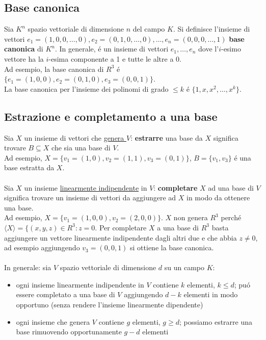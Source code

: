 \documentclass{article}
\begin{document}
\subsection{Base canonica}
Sia $K^n$ spazio vettoriale di dimensione $n$ del campo $K$. Si definisce l'insieme di vettori $e_1 = (1,0,0, \dots, 0), e_2 = (0,1,0, \dots, 0), \dots, e_n = (0,0,0,\dots,1)$ \textbf{base canonica} di $K^n$.
In generale, é un insieme di vettori $e_1, \dots, e_n$ dove l'$i$-esimo vettore ha la $i$-esima componente a 1 e tutte le altre a 0.\\
Ad esempio, la base canonica di $R^3$ é $\{e_1 = (1,0,0), e_2 = (0,1,0), e_3 = (0,0,1)\}$.\\
La base canonica per l'insieme dei polinomi di grado $\le k$ é $\{1, x, x^2, \dots, x^k\}$.

\subsection{Estrazione e completamento a una base}
Sia $X$ un insieme di vettori che \underline{genera $V$}: \textbf{estrarre} una base da $X$ significa trovare $B \subseteq X$ che sia una base di $V$.\\
Ad esempio, $X = \{v_1 = (1,0), v_2 = (1,1), v_3 = (0,1)\}$, $B = \{v_1, v_3\}$ é una base estratta da $X$.\\\\
Sia $X$ un insieme \underline{linearmente indipendente} in $V$: \textbf{completare} $X$ ad una base di $V$ significa trovare un insieme di vettori da aggiungere ad $X$ in modo da ottenere una base.\\
Ad esempio, $X = \{v_1 = (1,0,0), v_2 = (2,0,0)\}$. $X$ non genera $R^3$ perché $\langle X \rangle = \{(x,y,z) \in R^3 : z = 0$. Per completare $X$ a una base di $R^3$ basta aggiungere un vettore linearmente indipendente dagli altri due e che abbia $z \ne 0$, ad esempio aggiungendo $v_3 = (0,0,1)$ si ottiene la base canonica.\\\\
In generale: sia $V$ spazio vettoriale di dimensione $d$ su un campo $K$:
\begin{itemize}
	\item ogni insieme linearmente indipendente in $V$ contiene $k$ elementi, $k \le d$; puó essere completato a una base di $V$ aggiungendo $d-k$ elementi in modo opportuno (senza rendere l'insieme linearmente dipendente)
	\item ogni insieme che genera $V$ contiene $g$ elementi, $g \ge d$; possiamo estrarre una base rimuovendo opportunamente $g - d$ elementi
\end{itemize}
\end{document}
